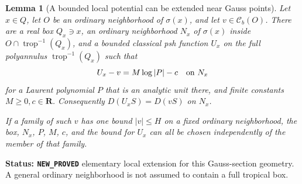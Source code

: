 \documentclass[11pt,a4paper]{article}
\numberwithin{equation}{section}
\newtheorem{lemma}[theorem]{Lemma}
\theoremstyle{definition}
\theoremstyle{remark}
\begin{document}
\begin{lemma}[A bounded local potential can be extended near Gauss points]
\label{lem:r6-local-gauss-log-extension}
Let $x\in Q$, let $O$ be an ordinary neighborhood of $\sigma(x)$,
and let $v\in\mathcal C_b(O)$. There are a real box $Q_x\ni x$,
an ordinary neighborhood $N_x$ of $\sigma(x)$ inside
$O\cap\operatorname{trop}^{-1}(Q_x)$, and a bounded classical psh
function $U_x$ on the \emph{full} polyannulus
$\operatorname{trop}^{-1}(Q_x)$ such that
\[
                     U_x-v=M\log|P|-c\quad\hbox{on }N_x
\]
for a Laurent polynomial $P$ that is an analytic unit there, and
finite constants $M\ge0,c\in\mathbf R$. Consequently
$D(U_xS)=D(vS)$ on $N_x$.

If a family of such $v$ has one bound $|v|\le H$ on a fixed ordinary
neighborhood, the box, $N_x$, $P$, $M$, $c$, and the bound for $U_x$
can all be chosen independently of the member of that family.
\end{lemma}

\noindent\textbf{Status: \texttt{NEW\_PROVED}} elementary local
extension for this Gauss-section geometry. A general ordinary
neighborhood is not assumed to contain a full tropical box.
\end{document}
